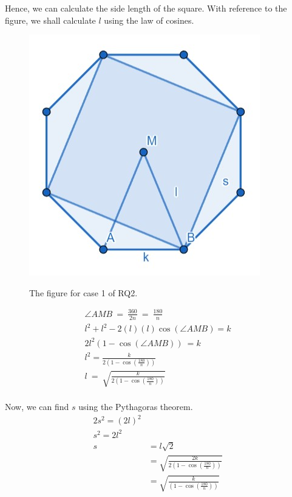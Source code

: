 \documentclass[12pt]{scrartcl}
\begin{document}
Hence, we can calculate the side length of the square. With reference to the figure, we shall calculate $l$ using the law of cosines. \\

\begin{figure}[h!]
	\centering
	\includegraphics[scale=.75]{images/rq2_1_2.jpg}
	\label{fig:rq2_1_2_img}
	\caption{The figure for case 1 of RQ2.}
\end{figure}

\begin{align*}
	\angle AMB\ =\ \frac{360}{2n}\ =\ \frac{180}{n}     \\
	l^{2}+l^{2}-2\left(l\right)\left(l\right)\cos\left(\angle AMB\right)=k    \\
	2l^{2}\left(1-\cos\left(\angle AMB\right)\right)\ =k           \\
	l^{2}=\frac{k}{2\left(1-\cos\left(\frac{180}{n}\right)\right)}   \\
	l\ =\ \sqrt{\frac{k}{2\left(1-\cos\left(\frac{180}{n}\right)\right)}}    \\
\end{align*}

Now, we can find $s$ using the Pythagoras theorem. \\

\begin{align*}
  2s^{2}=\left(2l\right)^{2}    \\
	s^{2}=2l^{2}   \\
	s & = l\sqrt{2}    \\
	& = \sqrt{\frac{2k}{2\left(1-\cos\left(\frac{180}{n}\right)\right)}} \\
	& = \sqrt{\frac{k}{\left(1-\cos\left(\frac{180}{n}\right)\right)}} \\
\end{align*}

\printbibliography
\end{document}

